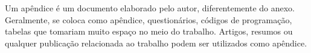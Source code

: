 \label{ap:A}

Um apêndice é um documento elaborado pelo autor, diferentemente do anexo. Geralmente, se coloca como apêndice, questionários, códigos de programação, tabelas que tomariam muito espaço no meio do trabalho. Artigos, resumos ou qualquer publicação relacionada ao trabalho podem ser utilizados como apêndice.